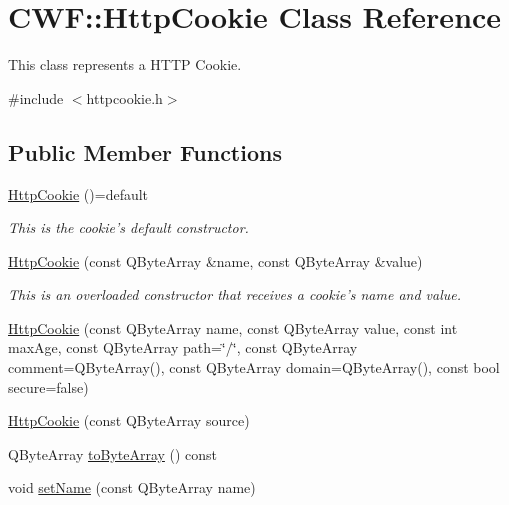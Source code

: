 \hypertarget{class_c_w_f_1_1_http_cookie}{\section{C\+W\+F\+:\+:Http\+Cookie Class Reference}
\label{class_c_w_f_1_1_http_cookie}
}


This class represents a H\+T\+T\+P Cookie.  




{\ttfamily \#include $<$httpcookie.\+h$>$}

\subsection*{Public Member Functions}
\begin{DoxyCompactItemize}
\item 
\hyperlink{class_c_w_f_1_1_http_cookie_a36fafa10bc6c2580acf0b11f007b11ae}{Http\+Cookie} ()=default
\begin{DoxyCompactList}\small\item\em This is the cookie's default constructor. \end{DoxyCompactList}\item 
\hyperlink{class_c_w_f_1_1_http_cookie_a2429ad80884ddb6712a9f1fa98e03eac}{Http\+Cookie} (const Q\+Byte\+Array \&name, const Q\+Byte\+Array \&value)
\begin{DoxyCompactList}\small\item\em This is an overloaded constructor that receives a cookie's name and value. \end{DoxyCompactList}\item 
\hyperlink{class_c_w_f_1_1_http_cookie_a062ac937c590c64cd705face36607cf7}{Http\+Cookie} (const Q\+Byte\+Array name, const Q\+Byte\+Array value, const int max\+Age, const Q\+Byte\+Array path=\char`\"{}/\char`\"{}, const Q\+Byte\+Array comment=Q\+Byte\+Array(), const Q\+Byte\+Array domain=Q\+Byte\+Array(), const bool secure=false)
\item 
\hyperlink{class_c_w_f_1_1_http_cookie_aaad501280c779b4601d1de1fc6e78d4e}{Http\+Cookie} (const Q\+Byte\+Array source)
\item 
Q\+Byte\+Array \hyperlink{class_c_w_f_1_1_http_cookie_a84c6628ab6c1955fe784bfbe6e66ca7e}{to\+Byte\+Array} () const 
\item 
void \hyperlink{class_c_w_f_1_1_http_cookie_aa64b038ecab5e9d1af27b81e3d32181c}{set\+Name} (const Q\+Byte\+Array name)
\item 

\end{DoxyCompactItemize}
